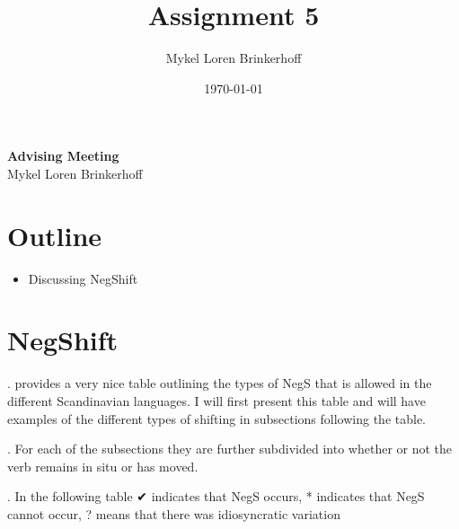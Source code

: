 \documentclass[12pt, letterpaper]{article}
\title{Assignment 5}
\author{Mykel Loren Brinkerhoff}
\date{\today}
\begin{document}
	
	\setlength{\Extopsep}{6pt}
	\setlength{\Exlabelsep}{9pt}		%
	
	
\begin{center}
	{\Large \textbf{Advising Meeting }}\\
	\vspace{6pt}
	Mykel Loren Brinkerhoff
\end{center}
\thispagestyle{fancy}

\section{Outline}

\begin{itemize}
	\item Discussing NegShift
\end{itemize}

\section{NegShift}

\ex. \citet{engelsScandinavianNegativeIndefinites2012} provides a very nice table outlining the types of NegS that is allowed in the different Scandinavian languages. I will first present this table and will have examples of the different types of shifting in subsections following the table.

\ex. For each of the subsections they are further subdivided into whether or not the verb remains in situ or has moved.

\ex. In the following table  ✔︎ indicates that NegS occurs, * indicates that NegS cannot occur, ? means that there was idiosyncratic  variation 
\end{document}
